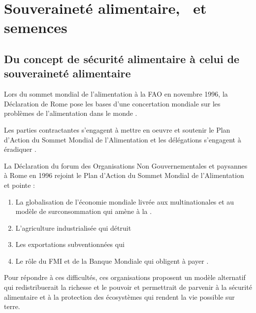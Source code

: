 \section{Souveraineté alimentaire, \agec~et semences}
\subsection{Du concept de sécurité alimentaire à celui de souveraineté alimentaire}

Lors du sommet mondial de l'alimentation à la FAO en novembre 1996, la Déclaration de Rome pose les bases d'une concertation mondiale sur les problèmes de l'alimentation dans le monde \cite{fao_declaration_1996}.

Les parties contractantes s'engagent à mettre en oeuvre et soutenir le Plan d’Action du Sommet Mondial de l’Alimentation et les délégations s'engagent à éradiquer .

La Déclaration du forum des Organisations Non Gouvernementales et paysannes à Rome en 1996 rejoint le Plan d’Action du Sommet Mondial de l’Alimentation et pointe  : 
\begin{enumerate}
\item La globalisation de l'économie mondiale livrée aux multinationales et au modèle de surconsommation qui amène à la .
\item L'agriculture industrialisée qui détruit 
\item Les exportations subventionnées qui %
\item Le rôle du FMI et de la Banque Mondiale qui obligent  à payer .
\end{enumerate}

Pour répondre à ces difficultés, ces organisations proposent un modèle alternatif  qui redistribuerait la richesse et le pouvoir et permettrait de parvenir à la sécurité alimentaire et à la protection des écosystèmes qui rendent la vie possible sur terre.


